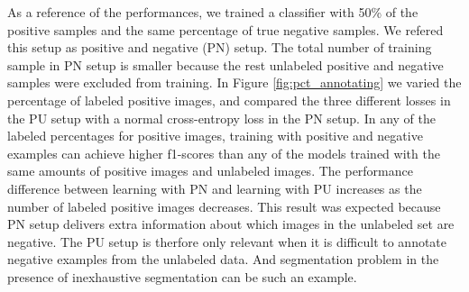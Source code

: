 \begin{table}[t]
\caption{Accuracy, mean precision, mean recall and mean f1-score on test set of the CIFAR dataset with true labels.The complete dataset contains images from CIFAR10 as the \textbf{positive} (P) set and images from CIFAR110 as the \textbf{negative} (N) set. The unlabeled positive examples from P set construct the \textbf{unlabeled} (U) set, together with N set. Precision and recall were averaged over ten positive classes. Experiments were repeated three times with random split of P set and U set, and standard deviations were around 0.01 if not explicitly mentioned.}
\label{tab:cifar}
\end{table}


\noindent
As a reference of the performances, we trained a classifier with 50\% of the positive samples and the same percentage of true negative samples.
We refered this setup as positive and negative (PN) setup.
The total number of training sample in PN setup is smaller because the rest unlabeled positive and negative samples were excluded from training.
In Figure \ref{fig:pct_annotating} we varied the percentage of labeled positive images, and compared the three different losses in the PU setup with a normal cross-entropy loss in the PN setup.
In any of the labeled percentages for positive images, training with positive and negative examples can achieve higher f1-scores than any of the models trained with the same amounts of positive images and unlabeled images.
The performance difference between learning with PN and learning with PU increases as the number of labeled positive images decreases.
This result was expected because PN setup delivers extra information about which images in the unlabeled set are negative.
The PU setup is therfore only relevant when it is difficult to annotate negative examples from the unlabeled data.
And segmentation problem in the presence of inexhaustive segmentation can be such an example.

